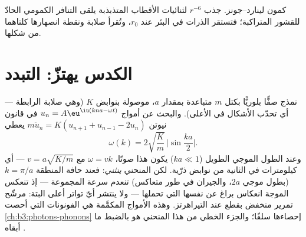 \begin{omfigure}

{\small كمون لينارد--جونز. جذب $r^{-6}$ لثنائيات الأقطاب
المتذبذبة يلقى التنافر الكمومي الحادّ للقشور
المتراكبة؛ فتستقر الذرات في البئر عند $r_0$، وتُقرأ صلابة
 ونقطة انصهارها كلتاهما من شكلها.}
\end{omfigure}

\section{الكدس يهتزّ: التبدد}

\begin{theorem}\label{thm:b3:crystalline-solids:dispersion}
نمذج صفًّا بلوريًّا بكتل $m$ متباعدة بمقدار $a$، موصولة بنوابض
$K$ (وهي صلابة الرابطة --- أي تحدّب الأشكال في الأعلى).
والبحث عن أمواج $u_n = A\eu^{\iu(kna - \omega t)}$ في قانون نيوتن
$m\ddot u_n = K(u_{n+1} + u_{n-1} - 2u_n)$ يعطي
\[
\omega(k) = 2\sqrt{\frac{K}{m}}\,\Big|\sin\frac{ka}{2}\Big| .
\]
وعند الطول الموجي الطويل ($ka \ll 1$) يكون هذا صوتًا، $\omega = vk$ مع
$v = a\sqrt{K/m}$ --- أي كيلومترات في الثانية من نوابض ذرّية.
لكن المنحني \emph{ينثني}: فعند حافة المنطقة $k = \pi/a$
(بطول موجي $2a$، والجيران في طور متعاكس) تنعدم سرعة المجموعة
--- إذ تنعكس الموجة انعكاس براغ عن  نفسها التي
تحملها --- ولا ينتشر أيّ تواتر أعلى البتة: 
مرشّح تمرير منخفض بقطع عند التيراهرتز. وهذه الأمواج المكمَّمة هي
الفونونات التي أحصت \cref{ch:b3:photons-phonons} إحصاءها سلفًا؛
والجزء الخطي من هذا المنحني هو بالضبط ما أبقاه .
\end{theorem}

